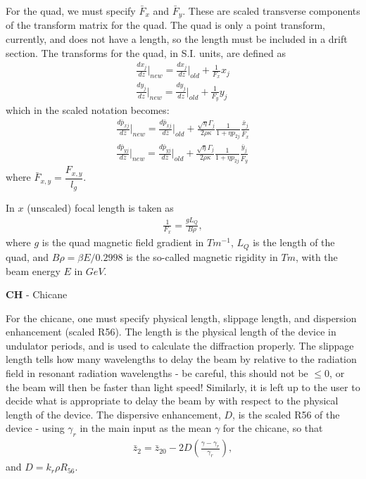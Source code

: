 \documentclass[12pt]{article}%
\begin{document}
For the quad, we must specify $\bar{F}_x$ and $\bar{F}_y$. These are scaled transverse components of the transform matrix for the quad. The quad is only a point transform, currently, and does not have a length, so the length must be included in a drift section. The transforms for the quad, in S.I. units, are defined as
\begin{align}
\frac{d x_j}{d z}  \bigg|_{new} = \frac{d x_j}{d z} \bigg|_{old} + \frac{1}{F_x} x_j \\
\frac{d y_j}{d z}  \bigg|_{new} = \frac{d y_j}{d z} \bigg|_{old} + \frac{1}{F_y} y_j
\end{align}
which in the scaled notation becomes:
\begin{align}
\frac{d \bar{p}_{xj}}{d \bar{z}} \bigg|_{new} = \frac{d \bar{p}_{xj}}{d \bar{z}}  \bigg|_{old} +\frac{\sqrt{\eta}\Gamma_j}{2\rho\kappa} \frac{1}{1+\eta p_{2j}}  \frac{\bar{x}_j}{\bar{F}_x} \\
\frac{d \bar{p}_{yj}}{d \bar{z}}  \bigg|_{new} = \frac{d \bar{p}_{yj}}{d \bar{z}}  \bigg|_{old} +\frac{\sqrt{\eta}\Gamma_j}{2\rho\kappa} \frac{1}{1+\eta p_{2j}}  \frac{\bar{y}_j}{\bar{F}_y}
\end{align}
where $\bar{F}_{x,y} = \dfrac{F_{x,y}}{l_g}$.

In $x$ (unscaled) focal length is taken as
\begin{align}
\frac{1}{F_x} = \frac{g L_Q}{B\rho},
\end{align}
where $g$ is the quad magnetic field gradient in $Tm^{-1}$, $L_Q$ is the length of the quad, and $B\rho = \beta E / 0.2998$ is the so-called magnetic rigidity in $Tm$, with the beam energy $E$ in $GeV$.

{\bf CH} - Chicane

For the chicane, one must specify physical length, slippage length, and dispersion enhancement (scaled R56). The length is the physical length of the device in undulator periods, and is used to calculate the diffraction properly. The slippage length tells how many wavelengths to delay the beam by relative to the radiation field in resonant radiation wavelengths - be careful, this should not be $\leq 0$, or the beam will then be faster than light speed! Similarly, it is left up to the user to decide what is appropriate to delay the beam by with respect to the physical length of the device. The dispersive enhancement, $D$, is the scaled R56 of the device - using $\gamma_r$ in the main input as the mean $\gamma$ for the chicane, so that
\begin{align}
\bar{z}_{2} = \bar{z}_{20} - 2D \left( \frac{\gamma - \gamma_r}{\gamma_r}  \right),
\end{align}
and $D = k_r \rho  R_{56}$.
\end{document}
